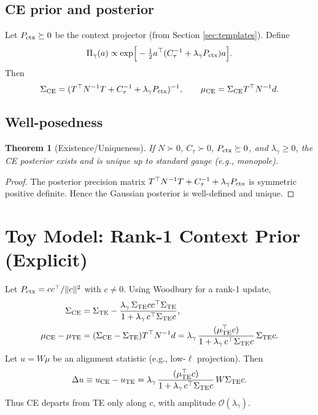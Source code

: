 \documentclass[11pt]{article}
\newtheorem{theorem}{Theorem}
\begin{document}
\subsection{CE prior and posterior}
Let $P_{\rm ctx}\succeq 0$ be the context projector (from Section \ref{sec:templates}). Define
\begin{equation}
\Pi_\gamma(a)\propto \exp\!\Big[-\tfrac12 a^\top (C_\tau^{-1}+\lambda_\gamma P_{\rm ctx}) a\Big].
\end{equation}
Then
\begin{equation}
\Sigma_{\rm CE}=(T^\top N^{-1}T+C_\tau^{-1}+\lambda_\gamma P_{\rm ctx})^{-1},\qquad
\mu_{\rm CE}=\Sigma_{\rm CE}T^\top N^{-1}d.
\end{equation}

\subsection{Well-posedness}
\begin{theorem}[Existence/Uniqueness]
If $N\succ 0$, $C_\tau\succ 0$, $P_{\rm ctx}\succeq 0$, and $\lambda_\gamma\ge 0$, the CE posterior exists and is unique up to standard gauge (e.g., monopole).
\end{theorem}
\begin{proof}
The posterior precision matrix $T^\top N^{-1}T+C_\tau^{-1}+\lambda_\gamma P_{\rm ctx}$ is symmetric positive definite. Hence the Gaussian posterior is well-defined and unique.
\end{proof}

\section{Toy Model: Rank-1 Context Prior (Explicit)}
\label{sec:toy}
Let $P_{\rm ctx}=cc^\top/\|c\|^2$ with $c\neq 0$. Using Woodbury for a rank-1 update,
\begin{align}
\Sigma_{\rm CE}&=\Sigma_{\rm TE}-\frac{\lambda_\gamma\,\Sigma_{\rm TE} c c^\top \Sigma_{\rm TE}}{1+\lambda_\gamma\, c^\top \Sigma_{\rm TE} c},\\
\mu_{\rm CE}-\mu_{\rm TE}&=(\Sigma_{\rm CE}-\Sigma_{\rm TE})T^\top N^{-1}d
= \lambda_\gamma\,\frac{(\mu_{\rm TE}^\top c)}{1+\lambda_\gamma\, c^\top \Sigma_{\rm TE} c}\,\Sigma_{\rm TE}c.
\end{align}
Let $u=W\mu$ be an alignment statistic (e.g., low-$\ell$ projection). Then
\begin{equation}
\Delta u \equiv u_{\rm CE}-u_{\rm TE}
= \lambda_\gamma\,\frac{(\mu_{\rm TE}^\top c)}{1+\lambda_\gamma\, c^\top \Sigma_{\rm TE} c}\, W\Sigma_{\rm TE}c.
\end{equation}
Thus CE departs from TE only along $c$, with amplitude $\mathcal O(\lambda_\gamma)$.
\end{document}
